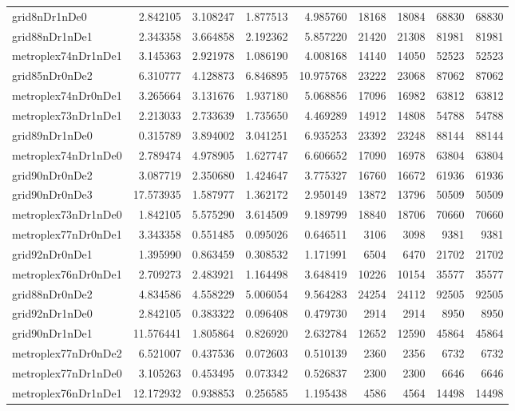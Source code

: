 \begin{longtable}{|l|r|r|r|r|r|r|r|r|}
grid8nDr1nDe0 & 2.842105 & 3.108247 & 1.877513 & 4.985760 & 18168 & 18084 & 68830 & 68830 \\
grid88nDr1nDe1 & 2.343358 & 3.664858 & 2.192362 & 5.857220 & 21420 & 21308 & 81981 & 81981 \\
metroplex74nDr1nDe1 & 3.145363 & 2.921978 & 1.086190 & 4.008168 & 14140 & 14050 & 52523 & 52523 \\
grid85nDr0nDe2 & 6.310777 & 4.128873 & 6.846895 & 10.975768 & 23222 & 23068 & 87062 & 87062 \\
metroplex74nDr0nDe1 & 3.265664 & 3.131676 & 1.937180 & 5.068856 & 17096 & 16982 & 63812 & 63812 \\
metroplex73nDr1nDe1 & 2.213033 & 2.733639 & 1.735650 & 4.469289 & 14912 & 14808 & 54788 & 54788 \\
grid89nDr1nDe0 & 0.315789 & 3.894002 & 3.041251 & 6.935253 & 23392 & 23248 & 88144 & 88144 \\
metroplex74nDr1nDe0 & 2.789474 & 4.978905 & 1.627747 & 6.606652 & 17090 & 16978 & 63804 & 63804 \\
grid90nDr0nDe2 & 3.087719 & 2.350680 & 1.424647 & 3.775327 & 16760 & 16672 & 61936 & 61936 \\
grid90nDr0nDe3 & 17.573935 & 1.587977 & 1.362172 & 2.950149 & 13872 & 13796 & 50509 & 50509 \\
metroplex73nDr1nDe0 & 1.842105 & 5.575290 & 3.614509 & 9.189799 & 18840 & 18706 & 70660 & 70660 \\
metroplex77nDr0nDe1 & 3.343358 & 0.551485 & 0.095026 & 0.646511 & 3106 & 3098 & 9381 & 9381 \\
grid92nDr0nDe1 & 1.395990 & 0.863459 & 0.308532 & 1.171991 & 6504 & 6470 & 21702 & 21702 \\
metroplex76nDr0nDe1 & 2.709273 & 2.483921 & 1.164498 & 3.648419 & 10226 & 10154 & 35577 & 35577 \\
grid88nDr0nDe2 & 4.834586 & 4.558229 & 5.006054 & 9.564283 & 24254 & 24112 & 92505 & 92505 \\
grid92nDr1nDe0 & 2.842105 & 0.383322 & 0.096408 & 0.479730 & 2914 & 2914 & 8950 & 8950 \\
grid90nDr1nDe1 & 11.576441 & 1.805864 & 0.826920 & 2.632784 & 12652 & 12590 & 45864 & 45864 \\
metroplex77nDr0nDe2 & 6.521007 & 0.437536 & 0.072603 & 0.510139 & 2360 & 2356 & 6732 & 6732 \\
metroplex77nDr1nDe0 & 3.105263 & 0.453495 & 0.073342 & 0.526837 & 2300 & 2300 & 6646 & 6646 \\
metroplex76nDr1nDe1 & 12.172932 & 0.938853 & 0.256585 & 1.195438 & 4586 & 4564 & 14498 & 14498 \\

\end{longtable}
